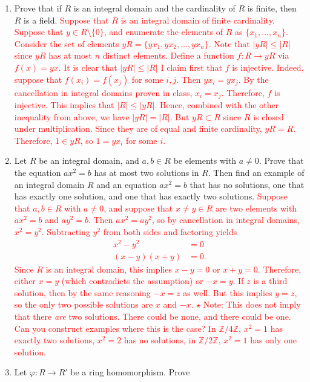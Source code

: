 \documentclass[12pt]{article}
\newcommand{\bbZ}{\mathbb{Z}}
\newcommand{\solution}[1]{\textcolor{red}{#1}}
\begin{document}
\begin{enumerate}
{  their greatest common divisor). The other direction is similar.}
\item Prove that if $R$ is an integral domain and the cardinality of
  $R$ is finite, then $R$ is a field.  
\solution{
Suppose that $R$ is an integral domain of finite cardinality. Suppose
that $y\in R\setminus \{0\}$, and enumerate the elements of $R$ as
$\{x_1,\dotsc, x_n\}$. Consider the set of elements $yR =
\{yx_1,yx_2,\dotsc, yx_n\}$. Note that $\lvert yR\rvert \leq \lvert
R\rvert$ since $yR$ has at most $n$ distinct elements. Define a
function $f: R\rightarrow yR$ via $f(x)=yx$. It is clear that $\lvert yR\rvert \leq \lvert
R\rvert$ I claim first that $f$ is injective. Indeed,
suppose that $f(x_i)=f(x_j)$ for some $i,j$. Then $yx_i=yx_j$. By the
cancellation in integral domains proven in class,
$x_i=x_j$. Therefore, $f$ is injective. This implies that $\lvert R
\rvert\leq \lvert yR\rvert$. Hence, combined with the other inequality
from above, we have $\lvert yR \rvert = \lvert R\rvert$. But
$yR\subset R$ since $R$ is closed under multiplication. Since they are
of equal and finite cardinality, $yR=R$. Therefore, $1\in yR$, so
$1=yx_i$ for some $i$. }
\item Let $R$ be an integral domain, and $a,b\in R$ be elements with
  $a\neq 0$. Prove that the equation $ax^2=b$ has at most two
  solutions in $R$. Then find an example of an integral domain $R$ and
  an equation $ax^2=b$ that has no solutions, one that has exactly one
  solution, and one that has exactly two solutions.
\solution{Suppose that $a,b\in R$ with $a\neq 0$, and suppose that
  $x\neq y\in R$ are two elements with $ax^2=b$ and $ay^2=b$. Then
  $ax^2=ay^2$, so by cancellation in integral domains,
  $x^2=y^2$. Subtracting $y^2$ from both sides and factoring yields 
  \begin{align*}
    x^2-y^2 &= 0\\
(x-y)(x+y) &=0.
  \end{align*}
Since $R$ is an integral domain, this implies $x-y=0$ or
$x+y=0$. Therefore, either $x=y$ (which contradicts the assumption) or
$-x=y$. If $z$ is a third solution, then by the same reasoning $-x=z$
as well. But this implies $y=z$, so the only two possible solutions
are $x$ and $-x$. 
$\star$ Note: This does not imply that there \emph{are} two
solutions. There could be none, and there could be one. Can you
construct examples where this is the case? In $\bbZ/4\bbZ$, $x^2=1$
has exactly two solutions, $x^2=2$ has no solutions, in $\bbZ/2\bbZ$,
$x^2=1$ has only one solution.}
\item Let $\varphi: R\rightarrow R'$ be a ring homomorphism. Prove

\end{enumerate}
\end{document}

